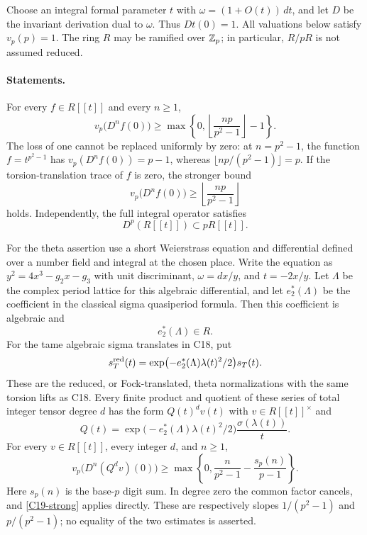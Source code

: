 \documentclass[11pt]{article}
\theoremstyle{definition}\newtheorem{definition}[theorem]{Definition}\newtheorem{remark}[theorem]{Remark}
\begin{document}
Choose an integral formal parameter $t$ with
$\omega=(1+O(t))\,dt$, and let $D$ be the invariant derivation dual
to $\omega$.  Thus $Dt(0)=1$.  All valuations below satisfy
$v_p(p)=1$.  The ring $R$ may be ramified over $\mathbb Z_p$; in
particular, $R/pR$ is not assumed reduced.

\paragraph{Statements.}
For every $f\in R[[t]]$ and every $n\geq1$,
\begin{equation}\label{C19-strong}
 v_p\bigl(D^nf(0)\bigr)
 \geq\max\left\{0,
       \left\lfloor\frac{np}{p^2-1}\right\rfloor-1\right\}.
\end{equation}
The loss of one cannot be replaced uniformly by zero: at
$n=p^2-1$, the function $f=t^{p^2-1}$ has
$v_p(D^nf(0))=p-1$, whereas
$\lfloor np/(p^2-1)\rfloor=p$.
If the torsion-translation trace of $f$ is zero, the stronger bound
\begin{equation}\label{C19-trace-zero}
 v_p\bigl(D^nf(0)\bigr)
       \geq\left\lfloor\frac{np}{p^2-1}\right\rfloor
\end{equation}
holds.  Independently, the full integral operator satisfies
\begin{equation}\label{C19-Dp}
 D^p(R[[t]])\subset pR[[t]].
\end{equation}

For the theta assertion use a short Weierstrass equation and
differential defined over a number field and integral at the
chosen place.  Write the equation as
$y^2=4x^3-g_2x-g_3$ with unit discriminant,
$\omega=dx/y$, and $t=-2x/y$.  Let $\Lambda$ be the complex period
lattice for this algebraic differential, and let $e_2^*(\Lambda)$
be the coefficient in the classical sigma quasiperiod formula.
Then this coefficient is algebraic and
\begin{equation}\label{C19-e2-integral}
 e_2^*(\Lambda)\in R.
\end{equation}
For the tame algebraic sigma translates in C18, put
\[
 s_T^{\rm red}(t)=
 \exp\bigl(-e_2^*(\Lambda)\lambda(t)^2/2\bigr)s_T(t).
\]
These are the reduced, or Fock-translated, theta normalizations
with the same torsion lifts as C18.  Every finite product and
quotient of these series of total integer tensor degree $d$ has
the form $Q(t)^d v(t)$ with $v\in R[[t]]^\times$ and
\[
 Q(t)=\exp\bigl(-e_2^*(\Lambda)\lambda(t)^2/2\bigr)
            \frac{\sigma(\lambda(t))}{t}.
\]
For every $v\in R[[t]]$, every integer $d$, and $n\geq1$,
\begin{equation}\label{C19-theta-weak}
 v_p\bigl(D^n(Q^dv)(0)\bigr)
 \geq\max\left\{0,
       \frac{n}{p^2-1}-\frac{s_p(n)}{p-1}\right\}.
\end{equation}
Here $s_p(n)$ is the base-$p$ digit sum.  In degree zero the common
factor cancels, and \eqref{C19-strong} applies directly.
These are respectively slopes $1/(p^2-1)$ and $p/(p^2-1)$;
no equality of the two estimates is asserted.
\end{document}
